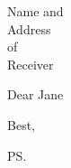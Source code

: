 \documentclass[letterpaper,12pt]{letter}
\begin{document}
\begin{letter}{Name and \\ Address \\ of \\ Receiver}

\opening{Dear Jane}

\lipsum

\closing{Best,}

\cc{}           %
\encl{}         %
\ps{}           %

\end{letter}
\end{document}
